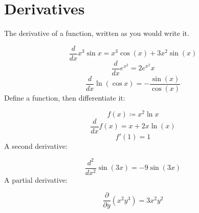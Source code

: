 \documentclass[11pt,a4paper]{article}
\theoremstyle{plain}
\theoremstyle{definition}
\theoremstyle{remark}
\begin{document}
\section*{Derivatives}

The derivative of a function, written as you would write it.

\begin{equation*}
  \frac{d}{dx} x^3 \sin x = x^{3} \cos\left(x\right) + 3 x^{2} \sin\left(x\right)
\end{equation*}
\begin{equation*}
  \frac{d}{dx} e^{x^2} = 2 e^{x^{2}} x
\end{equation*}
\begin{equation*}
  \frac{d}{dx} \ln(\cos x) = -\frac{\sin\left(x\right)}{\cos\left(x\right)}
\end{equation*}
Define a function, then differentiate it:

\begin{equation*}
  f(x) \coloneqq  x^2 \ln x
\end{equation*}
\begin{equation*}
  \frac{d}{dx} f(x) = x + 2 x \ln\left(x\right)
\end{equation*}
\begin{equation*}
  f'(1) = 1
\end{equation*}
A second derivative:

\begin{equation*}
  \frac{d^2}{dx^2} \sin(3 x) = -9 \sin\left(3 x\right)
\end{equation*}
A partial derivative:

\begin{equation*}
  \frac{\partial}{\partial y} (x^2 y^3) = 3 x^{2} y^{2}
\end{equation*}
\end{document}
